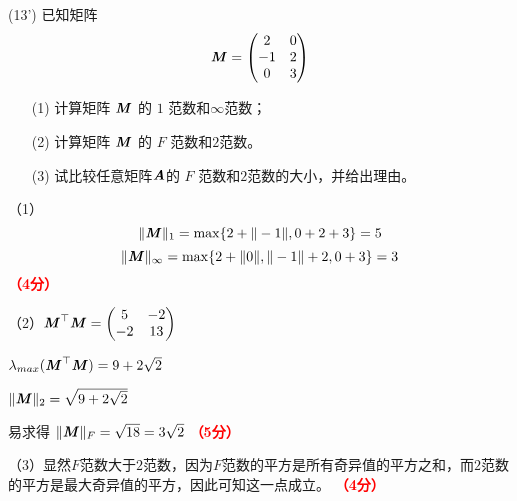 \documentclass[12pt,a4paper,openany,twoside]{ctexbook}
\begin{document}
\begin{exercise}(13')
	已知矩阵\[ \boldsymbol{\mathit{M}} = \begin{pmatrix}
		2&0\\
		-1&2\\
		0&3\\
	\end{pmatrix}
	\]
	\begin{itemize}
		\item [(1)] 计算矩阵 $\boldsymbol{\mathit{M}}$ 的 $1$ 范数和$\infty$范数；
		\item [(2)] 计算矩阵 $\boldsymbol{\mathit{M}}$ 的 $F$ 范数和$2$范数。
		\item [(3)] 试比较任意矩阵$\boldsymbol{\mathit{A}}$的 $F$ 范数和$2$范数的大小，并给出理由。
	\end{itemize}
\end{exercise}
\begin{Solution}
	（1）	
	$$\|\boldsymbol{\mathit{M}}\|_1=\max\{2+\|-1\|,0+2+3\}=5$$ 
	$$\|\boldsymbol{\mathit{M}}\|_{\infty}=\max\{2+\|0\|,\|-1\|+2, 0+3\}=3$$
	\hfill \textcolor{red}{\textbf{（4分）}}
	
	（2）$\boldsymbol{\mathit{M}}^\top \boldsymbol{\mathit{M}}=\begin{pmatrix}5&-2\\-2&13\end{pmatrix}$
	
	$\lambda_{max}(\boldsymbol{\mathit{M}}^\top \boldsymbol{\mathit{M}})=9+2\sqrt{2}$
	
	$\|\boldsymbol{\mathit{M}}\|_2=\sqrt{9+2\sqrt{2}}$ 
	
	易求得
	$\|\boldsymbol{\mathit{M}}\|_F=\sqrt{18}=3\sqrt{2}$ 
	\hfill \textcolor{red}{\textbf{（5分）}}
	
	（3）显然$F$范数大于$2$范数，因为$F$范数的平方是所有奇异值的平方之和，而$2$范数的平方是最大奇异值的平方，因此可知这一点成立。 \hfill \textcolor{red}{\textbf{（4分）}}
\end{Solution}
\end{document}
